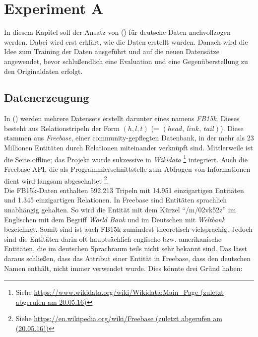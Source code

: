 
\chapter{Experiment A} %

\label{Chapter7} %


In diesem Kapitel soll der Ansatz von (\cite{bordes2013translating}) für deutsche Daten nachvollzogen werden.
Dabei wird erst erklärt, wie die Daten erstellt wurden. Danach wird die Idee zum Training der Daten ausgeführt und
auf die neuen Datensätze angewendet, bevor schlußendlich eine Evaluation und eine Gegenüberstellung zu den Originaldaten
erfolgt.

\section{Datenerzeugung}

In (\cite{bordes2013translating}) werden mehrere Datensets erstellt darunter eines namens \emph{FB15k}. Dieses
besteht aus Relationstripeln der Form $(h, l, t)$
(= $(head,\ link,\ tail)$). Diese stammen aus \emph{Freebase}, einer
community-gepflegten Datenbank, in der mehr als 23 Millionen Entitäten durch Relationen miteinander verknüpft sind.
Mittlerweile ist die Seite offline; das Projekt wurde sukzessive in \emph{Wikidata}
\footnote{Siehe \url{https://www.wikidata.org/wiki/Wikidata:Main_Page (zuletzt abgerufen am 20.05.16)}} integriert. Auch die
Freebase API, die als Programmierschnittstelle zum Abfragen von Informationen dient wird langsam abgeschaltet
\footnote{Siehe \url{https://en.wikipedia.org/wiki/Freebase (zuletzt abgerufen am (20.05.16))}}.\\

Die FB15k-Daten enthalten 592.213 Tripeln mit 14.951 einzigartigen Entitäten und 1.345 einzigartigen Relationen.
In Freebase sind Entitäten sprachlich unabhängig gehalten. So wird die Entität mit dem Kürzel ``/m/02vk52z''
im Englischen mit dem Begriff \emph{World Bank} und im Deutschen mit \emph{Weltbank} bezeichnet. Somit sind ist auch
FB15k zumindest theoretisch vielsprachig. Jedoch sind die Entitäten darin oft hauptsächlich englische bzw. amerikanische
Entitäten, die im deutschen Sprachraum teils nicht sehr bekannt sind. Das lässt daraus schließen, dass das Attribut einer
Entität in Freebase, dass den deutschen Namen enthält, nicht immer verwendet wurde. Dies könnte drei Gründ haben:

